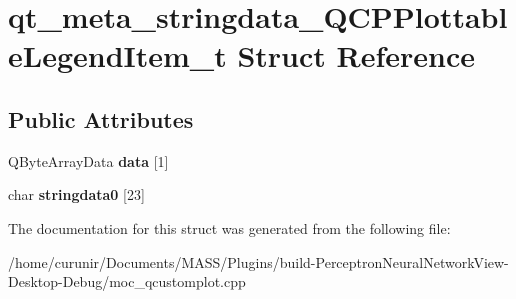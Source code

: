 \hypertarget{structqt__meta__stringdata___q_c_p_plottable_legend_item__t}{}\section{qt\+\_\+meta\+\_\+stringdata\+\_\+\+Q\+C\+P\+Plottable\+Legend\+Item\+\_\+t Struct Reference}
\label{structqt__meta__stringdata___q_c_p_plottable_legend_item__t}
\subsection*{Public Attributes}
\begin{DoxyCompactItemize}
\item 
Q\+Byte\+Array\+Data {\bfseries data} \mbox{[}1\mbox{]}\hypertarget{structqt__meta__stringdata___q_c_p_plottable_legend_item__t_a56d928faacdea012d9b501b879ef98a8}{}\label{structqt__meta__stringdata___q_c_p_plottable_legend_item__t_a56d928faacdea012d9b501b879ef98a8}

\item 
char {\bfseries stringdata0} \mbox{[}23\mbox{]}\hypertarget{structqt__meta__stringdata___q_c_p_plottable_legend_item__t_a2add548f134b64b363d6ee1b2125da1d}{}\label{structqt__meta__stringdata___q_c_p_plottable_legend_item__t_a2add548f134b64b363d6ee1b2125da1d}

\end{DoxyCompactItemize}


The documentation for this struct was generated from the following file\+:\begin{DoxyCompactItemize}
\item 
/home/curunir/\+Documents/\+M\+A\+S\+S/\+Plugins/build-\/\+Perceptron\+Neural\+Network\+View-\/\+Desktop-\/\+Debug/moc\+\_\+qcustomplot.\+cpp\end{DoxyCompactItemize}
